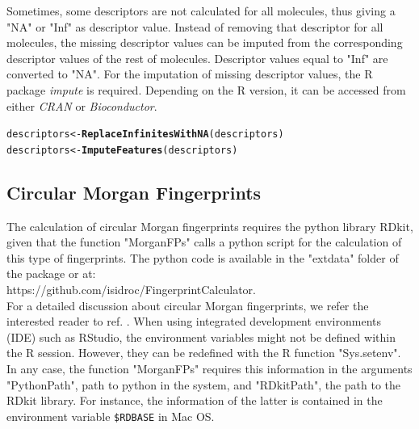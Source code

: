 \documentclass[twoside,a4wide,12pt]{article}\usepackage[]{graphicx}\usepackage[]{color}
\makeatletter
\newcommand{\hlstd}[1]{\textcolor[rgb]{0.345,0.345,0.345}{#1}}%
\newcommand{\hlkwb}[1]{\textcolor[rgb]{0.69,0.353,0.396}{#1}}%
\newcommand{\hlkwd}[1]{\textcolor[rgb]{0.737,0.353,0.396}{\textbf{#1}}}%
\newenvironment{kframe}{%
 \def\at@end@of@kframe{}%
 \ifinner\ifhmode%
  \def\at@end@of@kframe{\end{minipage}}%
  \begin{minipage}{\columnwidth}%
 \fi\fi%
 \def\FrameCommand##1{\hskip\@totalleftmargin \hskip-\fboxsep
 \colorbox{shadecolor}{##1}\hskip-\fboxsep
     \hskip-\linewidth \hskip-\@totalleftmargin \hskip\columnwidth}%
 \MakeFramed {\advance\hsize-\width
   \@totalleftmargin\z@ \linewidth\hsize
   \@setminipage}}%
 {\par\unskip\endMakeFramed%
 \at@end@of@kframe}
\newenvironment{knitrout}{}{} %
\makeatother
\begin{document}
Sometimes, some descriptors are not calculated for all molecules, thus giving a "NA" or "Inf" as descriptor value.
Instead of removing that descriptor for all molecules, the missing descriptor values can be imputed from the corresponding descriptor values of the rest of molecules.
Descriptor values equal to "Inf" are converted to "NA".
For the imputation of missing descriptor values, the R package {\it impute} is required.
Depending on the R version, it can be accessed from either {\it CRAN} or {\it Bioconductor}.

\begin{knitrout}
\color{fgcolor}\begin{kframe}
\begin{alltt}
\hlstd{descriptors} \hlkwb{<-} \hlkwd{ReplaceInfinitesWithNA}\hlstd{(descriptors)}
\hlstd{descriptors} \hlkwb{<-} \hlkwd{ImputeFeatures}\hlstd{(descriptors)}
\end{alltt}
\end{kframe}
\end{knitrout}


\subsection{Circular Morgan Fingerprints}
The calculation of circular Morgan fingerprints requires the python library RDkit, given that the function "MorganFPs" calls a python script for the calculation of this type of fingerprints.
The python code is available in the "extdata" folder of the package or at:\\
https://github.com/isidroc/FingerprintCalculator.\\
For a detailed discussion about circular Morgan fingerprints, we refer
the interested reader to ref. \cite{morgan}.
When using integrated development environments (IDE) such as RStudio,
the environment variables might not be defined within the R session.
However, they can be redefined with the R function "Sys.setenv".
In any case, the function "MorganFPs" requires this information in the arguments "PythonPath", path to python in the system, and "RDkitPath", the path to the RDkit library. 
For instance, the information of the latter is contained in the environment variable \verb|$RDBASE| in Mac OS.
\end{document}
